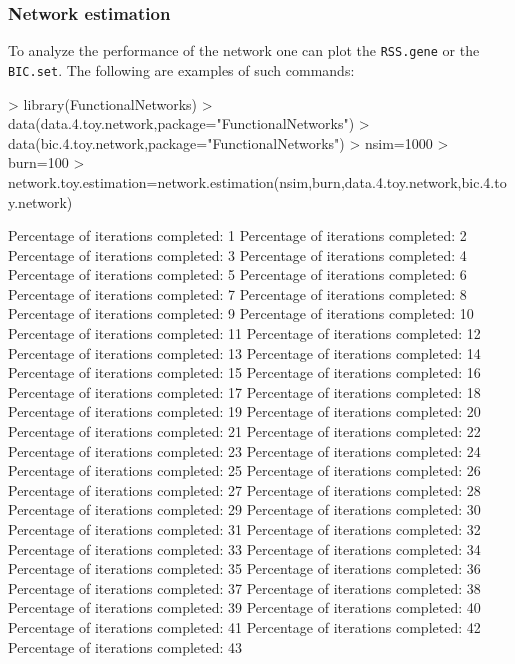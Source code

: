 \documentclass[12pt]{article}
\newcommand{\Robject}[1]{{\texttt{#1}}}
\begin{document}
\subsubsection{Network estimation}
To analyze the performance of the network one can plot the \Robject{RSS.gene} or the \Robject{BIC.set}. The following are examples of such commands:
\footnotesize
\begin{Schunk}
\begin{Sinput}
> library(FunctionalNetworks)
> data(data.4.toy.network,package="FunctionalNetworks")
> data(bic.4.toy.network,package="FunctionalNetworks")
> nsim=1000
> burn=100
> network.toy.estimation=network.estimation(nsim,burn,data.4.toy.network,bic.4.toy.network)
\end{Sinput}
\begin{Soutput}
Percentage of iterations completed: 1 
Percentage of iterations completed: 2 
Percentage of iterations completed: 3 
Percentage of iterations completed: 4 
Percentage of iterations completed: 5 
Percentage of iterations completed: 6 
Percentage of iterations completed: 7 
Percentage of iterations completed: 8 
Percentage of iterations completed: 9 
Percentage of iterations completed: 10 
Percentage of iterations completed: 11 
Percentage of iterations completed: 12 
Percentage of iterations completed: 13 
Percentage of iterations completed: 14 
Percentage of iterations completed: 15 
Percentage of iterations completed: 16 
Percentage of iterations completed: 17 
Percentage of iterations completed: 18 
Percentage of iterations completed: 19 
Percentage of iterations completed: 20 
Percentage of iterations completed: 21 
Percentage of iterations completed: 22 
Percentage of iterations completed: 23 
Percentage of iterations completed: 24 
Percentage of iterations completed: 25 
Percentage of iterations completed: 26 
Percentage of iterations completed: 27 
Percentage of iterations completed: 28 
Percentage of iterations completed: 29 
Percentage of iterations completed: 30 
Percentage of iterations completed: 31 
Percentage of iterations completed: 32 
Percentage of iterations completed: 33 
Percentage of iterations completed: 34 
Percentage of iterations completed: 35 
Percentage of iterations completed: 36 
Percentage of iterations completed: 37 
Percentage of iterations completed: 38 
Percentage of iterations completed: 39 
Percentage of iterations completed: 40 
Percentage of iterations completed: 41 
Percentage of iterations completed: 42 
Percentage of iterations completed: 43 

\end{Soutput}
\end{Schunk}
\end{document}
